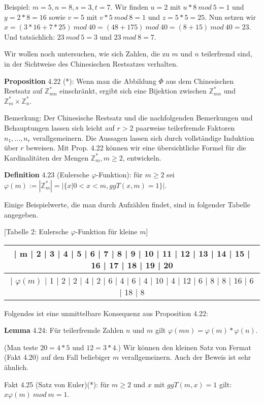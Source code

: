 \documentclass[a4paper]{article}
\begin{document}
\begin{multicols}{3}
    Beispiel: $m=5,n=8,s=3,t=7$. Wir finden $u=2$ mit $u*8\ mod\ 5 = 1$ und $y= 2*8=16$ sowie $v=5$ mit $v*5\ mod\ 8=1$ und $z=5*5=25$. Nun setzen wir $x=(3*16+7*25) \ mod\ 40=(48+175)\ mod\ 40 = (8 + 15)\ mod\ 40 = 23$. Und tatsächlich: $23\ mod\ 5 = 3$ und $23\ mod\ 8 = 7$.

    Wir wollen noch untersuchen, wie sich Zahlen, die zu $m$ und $n$ teilerfremd sind, in der Sichtweise des Chinesischen Restsatzes verhalten.

    \textbf{Proposition} 4.22 (*): Wenn man die Abbildung $\Phi$ aus dem Chinesischen Restsatz auf $\mathbb{Z}^*_{mn}$ einschränkt, ergibt sich eine Bijektion zwischen $\mathbb{Z}^*_{mn}$ und $\mathbb{Z}^*_m\times\mathbb{Z}^*_n$.

    Bemerkung: Der Chinesische Restsatz und die nachfolgenden Bemerkungen und Behauptungen lassen sich leicht auf $r>2$ paarweise teilerfremde Faktoren $n_1,...,n_r$
    verallgemeinern. Die Aussagen lassen sich durch vollständige Induktion über $r$ beweisen. Mit Prop. 4.22 können wir eine übersichtliche Formel für die Kardinalitäten der Mengen $\mathbb{Z}^*_m, m\geq 2$, entwickeln.

    \textbf{Definition} 4.23 (Eulersche $\varphi$-Funktion): für $m\geq 2$ sei $\varphi(m):=|\mathbb{Z}^*_m| =|\{x| 0<x<m,ggT(x,m) = 1\}|$.

    Einige Beispielwerte, die man durch Aufzählen findet, sind in folgender Tabelle angegeben.

        [Tabelle 2: Eulersche $\varphi$-Funktion für kleine $m$]
    \begin{tabular}{c}
        | m  | 2  | 3  | 4  | 5  | 6  | 7  | 8  | 9  | 10 | 11 | 12 | 13 | 14 | 15 | 16 | 17 | 18 | 19 | 20 \\\hline
        | $\varphi(m)$ | 1  | 2  | 2  | 4  | 2  | 6  | 4  | 6  | 4  | 10 | 4  | 12 | 6  | 8  | 8  | 16 | 6  | 18 | 8
    \end{tabular}

    Folgendes ist eine unmittelbare Konsequenz aus Proposition 4.22:

    \textbf{Lemma} 4.24: Für teilerfremde Zahlen $n$ und $m$ gilt $\varphi(mn)=\varphi(m)*\varphi(n)$.

    (Man teste $20=4*5$ und $12=3*4$.)
    Wir können den kleinen Satz von Fermat (Fakt 4.20) auf den Fall beliebiger $m$ verallgemeinern. Auch der Beweis ist sehr ähnlich.

    Fakt 4.25 (Satz von Euler)(*): für $m\geq 2$ und $x$ mit $ggT(m,x) = 1$ gilt: $x\varphi(m)\ mod\ m=1$.


\end{multicols}
\end{document}
